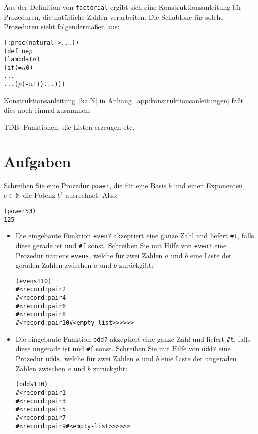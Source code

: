 Aus der Definition von \texttt{factorial} ergibt sich eine
Konstruktionsanleitung für Prozeduren, die natürliche Zahlen
verarbeiten.  Die Schablone für solche Prozeduren sieht folgendermaßen aus:
%
\begin{alltt}
(: proc (natural -> ...))
(define \(p\)
  (lambda (\(n\))
    (if (= \(n\) 0)
        ...
        ... (\(p\) (- \(n\) 1)) ...)))
\end{alltt}
\label{sec:ka-recursion-numbers}
%
Konstruktionsanleitung~\ref{ka:N} in
Anhang~\ref{app:konstruktionsanleitungen} faßt dies noch einmal
zusammen.

TDB: Funktionen, die Listen erzeugen etc.

\section*{Aufgaben}

\begin{aufgabe}\label{aufg:power}
  Schreiben Sie eine Prozedur \texttt{power}, die für eine Basis $b$ und
  einen Exponenten $e\in\mathbb{N}$ die Potenz $b^e$ ausrechnet.  Also:
\begin{alltt}
(power 5 3)
\evalsto{} 125
\end{alltt}
  \end{aufgabe}

\begin{aufgabe}\label{ex:evensodds}
  \begin{itemize}
  \item
    Die eingebaute Funktion \texttt{even?}
    akzeptiert eine ganze Zahl und liefert \verb|#t|, falls diese
    gerade ist und \verb|#f| sonst.
    Schreiben Sie mit Hilfe von \texttt{even?}
    eine Prozedur namens \texttt{evens}, welche für zwei
    Zahlen $a$ und $b$ eine Liste der geraden Zahlen zwischen $a$ und
    $b$ zurückgibt:
\begin{alltt}
(evens 1 10)
\evalsto{} #<record:pair 2
     #<record:pair 4
       #<record:pair 6
         #<record:pair 8
           #<record:pair 10 #<empty-list>>>>>>
\end{alltt}
  \item
    Die eingebaute Funktion \texttt{odd?}
    akzeptiert eine ganze Zahl und liefert \verb|#t|, falls diese
    ungerade ist und \verb|#f| sonst.
    Schreiben Sie mit Hilfe von \texttt{odd?} eine Prozedur \texttt{odds}, welche für zwei
    Zahlen $a$ und $b$ eine Liste der ungeraden Zahlen zwischen $a$ und $b$
    zurückgibt:
\begin{alltt}
(odds 1 10)
\evalsto{} #<record:pair 1
     #<record:pair 3
       #<record:pair 5
         #<record:pair 7
           #<record:pair 9 #<empty-list>>>>>>
\end{alltt}
  \end{itemize}
\end{aufgabe}

